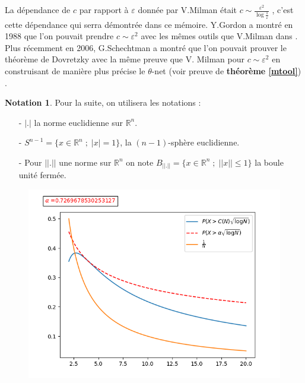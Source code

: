 \documentclass[12pt]{article}
\theoremstyle{definition}
\newtheorem*{notation}{Notation}
\begin{document}
La dépendance de $c$ par rapport à $\varepsilon$ donnée par V.Milman était $c \sim \frac{\varepsilon^2}{\log{\frac{1}{\varepsilon}}}$ \cite{VM1}, c'est cette dépendance qui serra démontrée dans ce mémoire. Y.Gordon a montré en 1988 que l'on pouvait prendre $c\sim \varepsilon^2$ avec les mêmes outils que V.Milman dans \cite{YG}. Plus récemment en 2006, G.Schechtman a montré que l'on pouvait prouver le théorème de Dovretzky avec la même preuve que V. Milman pour $c\sim \varepsilon^2$  en construisant de manière plus précise le $\theta$-net \cite{GS2} (voir preuve de \textbf{théorème \ref{mtool}}) .
\newpage\begin{notation}
	Pour la suite, on utilisera les notations : 
	\begin{enumerate}
		\item[-] $|.|$ la norme euclidienne sur $\mathbb{R}^n$.
		\item[-] $S^{n-1} = \big\{x\in \mathbb{R}^n\; ;\; |x|=1\big\}$, la $(n-1)$-sphère euclidienne.
		\item[-] Pour $||.||$ une norme sur $\mathbb{R}^n$ on note $B_{||.||}=\big\{x\in\mathbb{R}^n\;;\;||x||\leq 1\big\}$ la boule unité fermée.
	\end{enumerate}
\end{notation}

\begin{figure}
	\centering
	\includegraphics[scale=0.4]{figure_1.png}
\end{figure}
\end{document}
